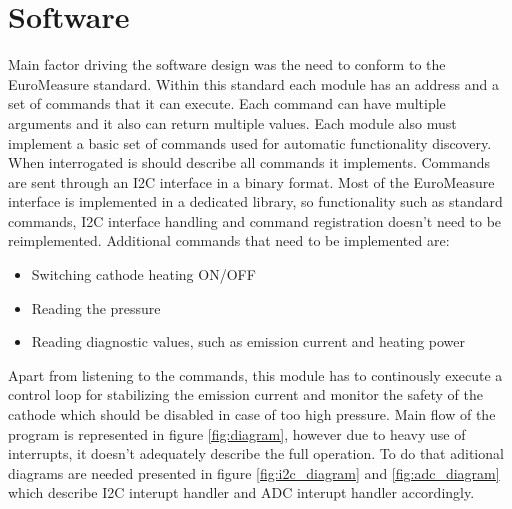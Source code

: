 \documentclass{article}
\begin{document}
\section{Software}
Main factor driving the software design was the need to conform to the EuroMeasure standard. Within this standard each module has an address and a set of commands that it can execute.
Each command can have multiple arguments and it also can return multiple values. Each module also must implement a basic set of commands used for automatic functionality discovery. When interrogated is should describe all commands it implements.
Commands are sent through an I2C interface in a binary format. Most of the EuroMeasure interface is implemented in a dedicated library, so functionality such as standard commands, I2C interface handling and command registration doesn't need to be reimplemented.
Additional commands that need to be implemented are:
\begin{itemize}
	\item Switching cathode heating ON/OFF
	\item Reading the pressure
	\item Reading diagnostic values, such as emission current and heating power
\end{itemize}
Apart from listening to the commands, this module has to continously execute a control loop for stabilizing the emission current and monitor the safety of the cathode which should be disabled in case of too high pressure.
Main flow of the program is represented in figure \ref{fig:diagram}, however due to heavy use of interrupts,
it doesn't adequately describe the full operation. To do that aditional diagrams are needed presented in figure \ref{fig:i2c_diagram} and \ref{fig:adc_diagram} which describe I2C interupt handler and ADC interupt handler accordingly.
\end{document}
